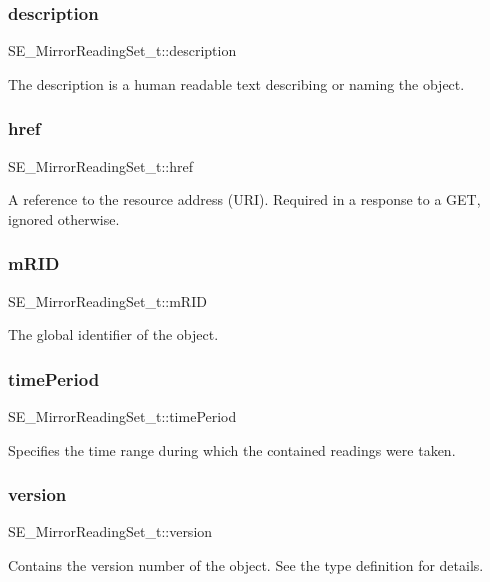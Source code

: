 \subsubsection{\texorpdfstring{description}{description}}
{\footnotesize\ttfamily S\+E\+\_\+\+Mirror\+Reading\+Set\+\_\+t\+::description}

The description is a human readable text describing or naming the object. \mbox{\label{group__MirrorReadingSet_ga122a57ae501a13ce4ccb4b5f38348080}} 
\subsubsection{\texorpdfstring{href}{href}}
{\footnotesize\ttfamily S\+E\+\_\+\+Mirror\+Reading\+Set\+\_\+t\+::href}

A reference to the resource address (U\+RI). Required in a response to a G\+ET, ignored otherwise. \mbox{\label{group__MirrorReadingSet_gab69106935620c1870a127bf728635d02}} 
\subsubsection{\texorpdfstring{m\+R\+ID}{mRID}}
{\footnotesize\ttfamily S\+E\+\_\+\+Mirror\+Reading\+Set\+\_\+t\+::m\+R\+ID}

The global identifier of the object. \mbox{\label{group__MirrorReadingSet_gad45245dcd90b290a44555565a335aa64}} 
\subsubsection{\texorpdfstring{time\+Period}{timePeriod}}
{\footnotesize\ttfamily S\+E\+\_\+\+Mirror\+Reading\+Set\+\_\+t\+::time\+Period}

Specifies the time range during which the contained readings were taken. \mbox{\label{group__MirrorReadingSet_gaea484e4cf9496a9f98da29f0759831c0}} 
\subsubsection{\texorpdfstring{version}{version}}
{\footnotesize\ttfamily S\+E\+\_\+\+Mirror\+Reading\+Set\+\_\+t\+::version}

Contains the version number of the object. See the type definition for details. 